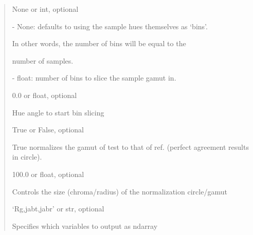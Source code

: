 \documentclass[letterpaper,10pt,english]{sphinxmanual}
\begin{document}
\begin{fulllineitems}
\begin{description}
\begin{quote}
\begin{description}
\item[{nhbins}] \leavevmode
\begin{DUlineblock}{0em}
\item[] None or int, optional
\item[]
\begin{DUlineblock}{\DUlineblockindent}
\item[] - None: defaults to using the sample hues themselves as ‘bins’. 
\item[]
\begin{DUlineblock}{\DUlineblockindent}
\item[] In other words, the number of bins will be equal to the 
\item[] number of samples.
\end{DUlineblock}
\item[] - float: number of bins to slice the sample gamut in.
\end{DUlineblock}
\end{DUlineblock}

\item[{start\_hue}] \leavevmode
\begin{DUlineblock}{0em}
\item[] 0.0 or float, optional
\item[] Hue angle to start bin slicing
\end{DUlineblock}

\item[{normalize\_gamut}] \leavevmode
\begin{DUlineblock}{0em}
\item[] True or False, optional
\item[] True normalizes the gamut of test to that of ref.
(perfect agreement results in circle).
\end{DUlineblock}

\item[{normalized\_chroma\_ref}] \leavevmode
\begin{DUlineblock}{0em}
\item[] 100.0 or float, optional
\item[] Controls the size (chroma/radius) of the normalization circle/gamut
\end{DUlineblock}

\item[{out}] \leavevmode
\begin{DUlineblock}{0em}
\item[] ‘Rg,jabt,jabr’ or str, optional
\item[] Specifies which variables to output as ndarray
\end{DUlineblock}


\end{description}
\end{quote}
\end{description}
\end{fulllineitems}
\end{document}
